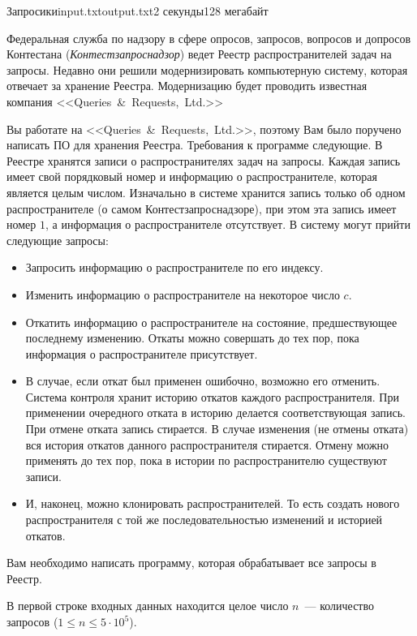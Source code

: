 \begin{problem}{Запросики}{input.txt}{output.txt}{2 секунды}{128 мегабайт}

Федеральная служба по надзору в сфере опросов, запросов, вопросов и допросов Контестана (\textit{Контестзапроснадзор}) ведет Реестр распространителей задач на запросы. Недавно они решили модернизировать компьютерную систему, которая отвечает за хранение Реестра. Модернизацию будет проводить известная компания <<Queries~\&~Requests,~Ltd.>>

Вы работате на <<Queries~\&~Requests,~Ltd.>>, поэтому Вам было поручено написать ПО для хранения Реестра. Требования к программе следующие. В Реестре хранятся записи о распространителях задач на запросы. Каждая запись имеет свой порядковый номер и информацию о распространителе, которая является целым числом. Изначально в системе хранится запись только об одном распространителе (о самом Контестзапроснадзоре), при этом эта запись имеет номер $1$, а информация о распространителе отсутствует. В систему могут прийти следующие запросы:

\begin{itemize}
\item Запросить информацию о распространителе по его индексу.
\item Изменить информацию о распространителе на некоторое число $c$.
\item Откатить информацию о распространителе на состояние, предшествующее последнему изменению. Откаты можно совершать до тех пор, пока информация о распространителе присутствует.
\item В случае, если откат был применен ошибочно, возможно его отменить. Система контроля хранит историю откатов каждого распространителя. При применении очередного отката в историю делается соответствующая запись. При отмене отката запись стирается. В случае изменения (не отмены отката) вся история откатов данного распространителя стирается. Отмену можно применять до тех пор, пока в истории по распространителю существуют записи.
\item И, наконец, можно клонировать распространителей. То есть создать нового распространителя с той же последовательностью изменений и историей откатов.
\end{itemize}

Вам необходимо написать программу, которая обрабатывает все запросы в Реестр.

\InputFile

В первой строке входных данных находится целое число $n$~--- количество запросов ($1 \le n \le 5\cdot 10^5$).


\end{problem}
